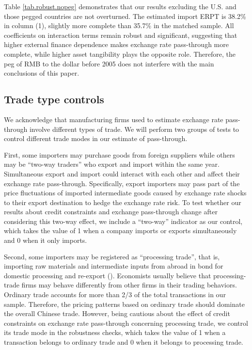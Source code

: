 \documentclass[12pt]{article}
\begin{document}
Table \ref{tab.robust.nopeg} demonstrates that our results excluding the U.S. and those pegged countries are not overturned. The estimated import ERPT is 38.2\% in column (1), slightly more complete than 35.7\% in the matched sample. All coefficients on interaction terms remain robust and significant, suggesting that higher external finance dependence makes exchange rate pass-through more complete, while higher asset tangibility plays the opposite role. Therefore, the peg of RMB to the dollar before 2005 does not interfere with the main conclusions of this paper.

\subsection{Trade type controls}

We acknowledge that manufacturing firms used to estimate exchange rate pass-through involve different types of trade. We will perform two groups of tests to control different trade modes in our estimate of pass-through.

First, some importers may purchase goods from foreign suppliers while others may be ``two-way traders'' who export and import within the same year. Simultaneous export and import could interact with each other and affect their exchange rate pass-through. Specifically, export importers may pass part of the price fluctuations of imported intermediate goods caused by exchange rate shocks to their export destination to hedge the exchange rate risk. To test whether our results about credit constraints and exchange pass-through change after considering this two-way effect, we include a ``two-way'' indicator as our control, which takes the value of 1 when a company imports or exports simultaneously and 0 when it only imports.

Second, some importers may be registered as ``processing trade'', that is, importing raw materials and intermediate inputs from abroad in bond for domestic processing and re-export (\cite{manova-yu2016}). Economists usually believe that processing-trade firms may behave differently from other firms in their trading behaviors. Ordinary trade accounts for more than 2/3 of the total transactions in our sample. Therefore, the pricing patterns based on ordinary trade should dominate the overall Chinese trade. However, being cautious about the effect of credit constraints on exchange rate pass-through concerning processing trade, we control its trade mode in the robustness checks, which takes the value of 1 when a transaction belongs to ordinary trade and 0 when it belongs to processing trade.
\end{document}
